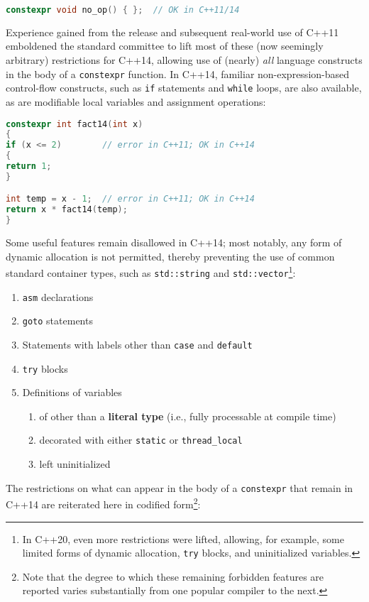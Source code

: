 \begin{lstlisting}[language=C++]
constexpr void no_op() { };  // OK in C++11/14
\end{lstlisting}

\noindent Experience gained from the release and subsequent real-world use of
C++11 emboldened the standard committee to lift most of these (now
seemingly arbitrary) restrictions for C++14, allowing use of (nearly)
\emph{all} language constructs in the body of a \texttt{constexpr}
function. In C++14, familiar non-expression-based control-flow
constructs, such as \texttt{if} statements and \texttt{while} loops, are
also available, as are modifiable local variables and assignment
operations:

\begin{lstlisting}[language=C++]
constexpr int fact14(int x)
{
if (x <= 2)        // error in C++11; OK in C++14
{
return 1;
}

int temp = x - 1;  // error in C++11; OK in C++14
return x * fact14(temp);
}
\end{lstlisting}

\noindent Some useful features remain disallowed in C++14; most notably, any form
of dynamic allocation is not permitted, thereby preventing the use of
common standard container types, such as \texttt{std::string} and
\texttt{std::vector}{\cprotect\footnote{In C++20, even more
restrictions were lifted, allowing, for example, some limited forms of
dynamic allocation, \texttt{try} blocks, and uninitialized variables.}}:
\begin{enumerate}
\item{\texttt{asm} declarations}
\item{\texttt{goto} statements}
\item{Statements with labels other than \texttt{case} and \texttt{default}}
\item{\texttt{try} blocks}
\item{Definitions of variables
\begin{enumerate}
\item{of other than a \textbf{literal type} (i.e., fully processable at compile time)}
\item{decorated with either \texttt{static} or \texttt{thread\_local}}
\item{left uninitialized}
\end{enumerate}
}
\end{enumerate}
The restrictions on what can appear in the body of a \texttt{constexpr}
that remain in C++14 are reiterated here in codified
form\footnote{Note that the degree to which these remaining forbidden features are reported varies substantially from one popular compiler to the next.}:

